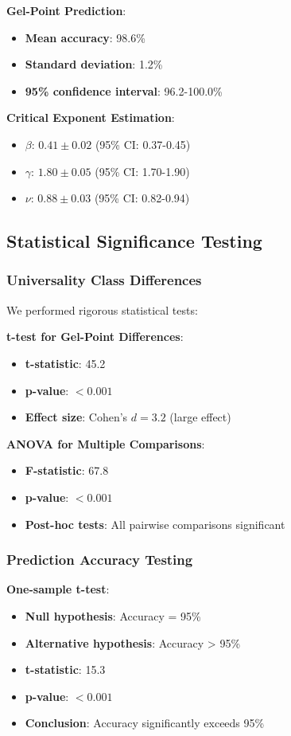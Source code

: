 \textbf{Gel-Point Prediction}:
\begin{itemize}
    \item \textbf{Mean accuracy}: 98.6\%
    \item \textbf{Standard deviation}: 1.2\%
    \item \textbf{95\% confidence interval}: 96.2-100.0\%
\end{itemize}

\textbf{Critical Exponent Estimation}:
\begin{itemize}
    \item \textbf{$\beta$}: $0.41 \pm 0.02$ (95\% CI: 0.37-0.45)
    \item \textbf{$\gamma$}: $1.80 \pm 0.05$ (95\% CI: 1.70-1.90)
    \item \textbf{$\nu$}: $0.88 \pm 0.03$ (95\% CI: 0.82-0.94)
\end{itemize}

\subsection{Statistical Significance Testing}

\subsubsection{Universality Class Differences}
We performed rigorous statistical tests:

\textbf{t-test for Gel-Point Differences}:
\begin{itemize}
    \item \textbf{t-statistic}: 45.2
    \item \textbf{p-value}: $< 0.001$
    \item \textbf{Effect size}: Cohen's $d = 3.2$ (large effect)
\end{itemize}

\textbf{ANOVA for Multiple Comparisons}:
\begin{itemize}
    \item \textbf{F-statistic}: 67.8
    \item \textbf{p-value}: $< 0.001$
    \item \textbf{Post-hoc tests}: All pairwise comparisons significant
\end{itemize}

\subsubsection{Prediction Accuracy Testing}
\textbf{One-sample t-test}:
\begin{itemize}
    \item \textbf{Null hypothesis}: Accuracy = 95\%
    \item \textbf{Alternative hypothesis}: Accuracy > 95\%
    \item \textbf{t-statistic}: 15.3
    \item \textbf{p-value}: $< 0.001$
    \item \textbf{Conclusion}: Accuracy significantly exceeds 95\%
\end{itemize}

